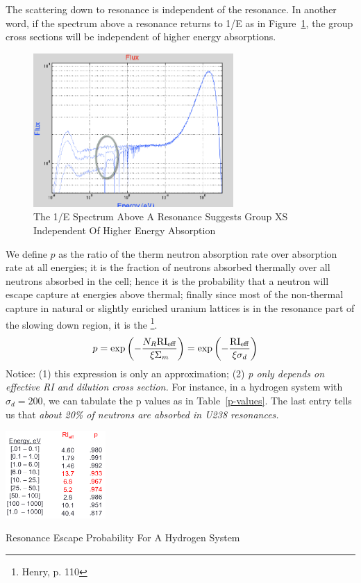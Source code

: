 \documentclass{school-22.211-notes}
\begin{document}
The scattering down to resonance is independent of the resonance. In another word, if the spectrum above a resonance returns to 1/E as in Figure~\ref{1overE}, the group cross sections will be independent of higher energy absorptions. 
\begin{figure}
  \centering
  \includegraphics[width=3in]{images/resonance-1-over-E.png}
  \caption{The 1/E Spectrum Above A Resonance Suggests Group XS Independent Of Higher Energy Absorption} \label{1overE}
\end{figure}


\clearpage
We define $p$ as the ratio of the therm neutron absorption rate over absorption rate at all energies; it is the fraction of neutrons absorbed thermally over all neutrons absorbed in the cell; hence it is the probability that a neutron will escape capture at energies above thermal; finally since most of the non-thermal capture in natural or slightly enriched uranium lattices is in the resonance part of the slowing down region, it is the \footnote{Henry, p. 110}. 
\begin{align}
p &= \exp \left( - \frac{N_R \mathrm{RI}_{\mathrm{eff}}}{\xi \Sigma_m} \right)  = \exp \left( - \frac{\mathrm{RI}_{\mathrm{eff}}}{\xi \sigma_d} \right)
\end{align}
Notice: (1) this expression is only an approximation; (2) \textit{p only depends on effective RI and dilution cross section.} For instance, in a hydrogen system with $\sigma_d = 200$, we can tabulate the p values as in Table~\ref{p-values}. The last entry tells us that \textit{about 20\% of neutrons are absorbed in U238 resonances.}
\begin{table}
  \centering
  \includegraphics[width=1.5in]{images/resonance-escape-probability.png}
  \caption{Resonance Escape Probability For A Hydrogen System} \label{p-values}
\end{table}
\end{document}
